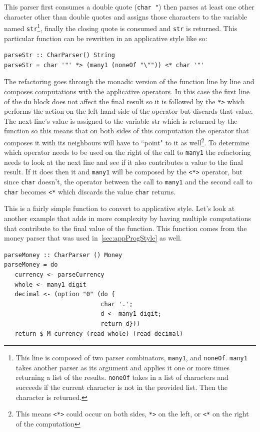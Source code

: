 This parser first consumes a double quote (\texttt{char \textquotesingle"\textquotesingle}) then parses at least one other character other than double quotes and assigns those characters to the variable named \texttt{str}\footnote{This line is composed of two parser combinators, \texttt{many1}, and \texttt{noneOf}. \texttt{many1} takes another parser as its argument and applies it one or more times returning a list of the results. \texttt{noneOf} takes in a list of characters and succeeds if the current character is not in the provided list. Then the character is returned.}, finally the closing quote is consumed and \texttt{str} is returned. This particular function can be rewritten in an applicative style like so:

\begin{lstlisting}[frame=tlrb]
parseStr :: CharParser() String
parseStr = char '"' *> (many1 (noneOf "\"")) <* char '"'
\end{lstlisting}

The refactoring goes through the monadic version of the function line by line and composes computations with the applicative operators. In this case the first line of the \texttt{do} block does not affect the final result so it is followed by the \texttt{*>} which performs the action on the left hand side of the operator but discards that value. The next line's value is assigned to the variable str which is returned by the function so this means that on both sides of this computation the operator that composes it with its neighbours will have to ``point" to it as well\footnote{This means \texttt{<*>} could occur on both sides, \texttt{*>} on the left, or \texttt{<*} on the right of the computation}. To determine which operator needs to be used on the right of the call to \texttt{many1} the refactoring needs to look at the next line and see if it also contributes a value to the final result. If it does then it and \texttt{many1} will be composed by the \texttt{<*>} operator, but since \texttt{char} doesn't, the operator between the call to \texttt{many1} and the second call to \texttt{char} becomes \texttt{<*} which discards the value \texttt{char} returns.

This is a fairly simple function to convert to applicative style. Let's look at another example that adds in more complexity by having multiple computations that contribute to the final value of the function. This function comes from the money parser that was used in~\ref{sec:appProgStyle} as well. 
\pagebreak
\begin{lstlisting}[frame=tlrb]
parseMoney :: CharParser () Money
parseMoney = do
   currency <- parseCurrency 
   whole <- many1 digit
   decimal <- (option "0" (do { 
                           char '.';
                           d <- many1 digit;
                           return d}))
   return $ M currency (read whole) (read decimal)
\end{lstlisting}

